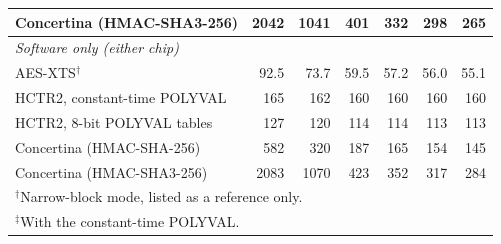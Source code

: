 \begin{table}[!hbt]
\begin{tabular}{lrrrrrr}
Concertina (HMAC-SHA3-256)                           & 2042 & 1041 & 401 & 332 & 298 & 265 \\
\hline
\multicolumn{7}{l}{\emph{Software only (either chip)}} \\
AES-XTS$^\dagger$                                    & 92.5 & 73.7 & 59.5 & 57.2 & 56.0 & 55.1 \\
HCTR2, constant-time POLYVAL                         & 165 & 162 & 160 & 160 & 160 & 160 \\
HCTR2, 8-bit POLYVAL tables                          & 127 & 120 & 114 & 114 & 113 & 113 \\
Concertina (HMAC-SHA-256)                            & 582 & 320 & 187 & 165 & 154 & 145 \\
Concertina (HMAC-SHA3-256)                           & 2083 & 1070 & 423 & 352 & 317 & 284 \\
\hline
\multicolumn{7}{l}{\footnotesize $^\dagger$Narrow-block mode, listed as a reference only.} \\
\multicolumn{7}{l}{\footnotesize $^\ddagger$With the constant-time POLYVAL.}
\end{tabular}
\end{table}


